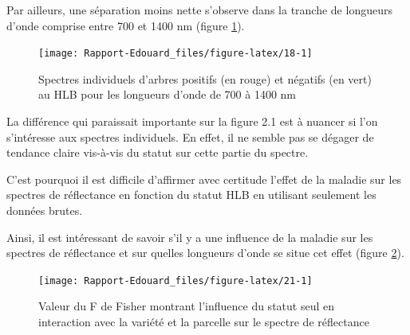 \documentclass[
  11pt,
  french,
  a4paper,
  extrafontsizes,onecolumn,openright
  ]{memoir}
\begin{document}
Par ailleurs, une séparation moins nette s'observe dans la tranche de longueurs d'onde comprise entre 700 et 1400 nm (figure \ref{fig:18}).

\scriptsize

\begin{figure}

{\centering \texttt{[image: Rapport-Edouard\_files/figure-latex/18-1]} 

}

\caption{Spectres individuels d’arbres positifs (en rouge) et négatifs (en vert) au HLB pour les longueurs d’onde de 700 à 1400 nm}\label{fig:18}
\end{figure}

\normalsize

La différence qui paraissait importante sur la figure 2.1 est à nuancer si l'on s'intéresse aux spectres individuels. En effet, il ne semble pas se dégager de tendance claire vis-à-vis du statut sur cette partie du spectre.

C'est pourquoi il est difficile d'affirmer avec certitude l'effet de la maladie sur les spectres de réflectance en fonction du statut HLB en utilisant seulement les données brutes.

Ainsi, il est intéressant de savoir s'il y a une influence de la maladie sur les spectres de réflectance et sur quelles longueurs d'onde se situe cet effet (figure \ref{fig:21}).

\scriptsize

\begin{figure}

{\centering \texttt{[image: Rapport-Edouard\_files/figure-latex/21-1]} 

}

\caption{Valeur du F de Fisher montrant l’influence du statut seul en interaction avec la variété et la parcelle sur le spectre de réflectance}\label{fig:21}
\end{figure}
\end{document}
